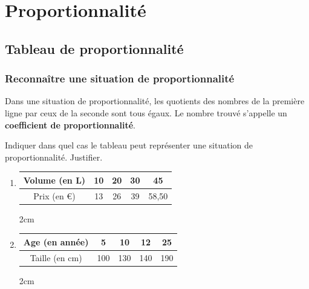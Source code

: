 \documentclass[a4paper]{book}
\begin{document}
\setcounter{chapter}{8}
\renewcommand{\monTitre}{Proportionnalité}
\chapter{\monTitre}
\thispagestyle{fancy} 

\section{Tableau de proportionnalité}
\subsection{Reconnaître une situation de proportionnalité}
    
    \begin{propriete} 
        Dans une situation de proportionnalité, les quotients des nombres de la première ligne par ceux de la seconde sont tous égaux. Le nombre trouvé s'appelle un \textbf{coefficient de proportionnalité}.
    \end{propriete}
    
    \begin{exemple} 
        Indiquer dans quel cas le tableau peut représenter une situation de proportionnalité. Justifier.

        \begin{enumerate}[leftmargin=*]
            \item \begin{tabular}{|c|c|c|c|c|}
                \hline
                Volume (en L) & 10 & 20 & 30 & 45 \\ \hline
                Prix (en €) & 13 & 26 & 39 & 58,50 \\ \hline
            \end{tabular}

            \begin{ZoneReponse}{2cm}
            \end{ZoneReponse}
            
            \item \begin{tabular}{|c|c|c|c|c|}
                \hline
                Age (en année) & 5 & 10 & 12 & 25 \\ \hline
                Taille (en cm) & 100 & 130 & 140 & 190 \\ \hline
            \end{tabular}

            \begin{ZoneReponse}{2cm}
            \end{ZoneReponse}
        \end{enumerate}
    \end{exemple}
\end{document}
